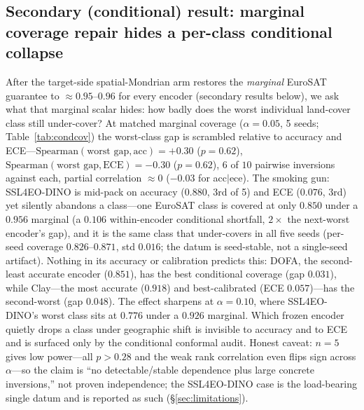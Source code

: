\documentclass[journal]{IEEEtran}
\renewcommand{\_}{\textunderscore\allowbreak}
\begin{document}
\subsection{Secondary (conditional) result: marginal coverage repair hides a per-class conditional collapse}
After the target-side spatial-Mondrian arm restores the \emph{marginal} EuroSAT guarantee to
$\approx0.95$--$0.96$ for every encoder (secondary results below), we ask what that marginal scalar hides:
how badly does the worst individual land-cover class still under-cover? At matched marginal coverage
($\alpha{=}0.05$, 5 seeds; Table~\ref{tab:condcov}) the worst-class gap is scrambled relative to
accuracy and ECE---$\mathrm{Spearman}(\text{worst gap},\text{acc})=+0.30$ ($p{=}0.62$),
$\mathrm{Spearman}(\text{worst gap},\text{ECE})=-0.30$ ($p{=}0.62$), $6$ of $10$ pairwise inversions
against each, partial correlation $\approx0$ ($-0.03$ for acc$\mid$ece). The smoking gun: SSL4EO-DINO is
mid-pack on accuracy ($0.880$, 3rd of 5) and ECE ($0.076$, 3rd) yet silently abandons a class---one
EuroSAT class is covered at only $0.850$ under a $0.956$ marginal (a $0.106$ within-encoder conditional
shortfall, $2\times$ the next-worst encoder's gap), and it is the same class that under-covers in all
five seeds (per-seed coverage $0.826$--$0.871$, std $0.016$; the datum is seed-stable, not a single-seed
artifact). Nothing in its accuracy or calibration predicts this:
DOFA, the second-least accurate encoder ($0.851$), has the best conditional coverage (gap
$0.031$), while Clay---the most accurate ($0.918$) and best-calibrated (ECE $0.057$)---has the
second-worst (gap $0.048$). The effect sharpens at $\alpha{=}0.10$, where SSL4EO-DINO's worst class
sits at $0.776$ under a $0.926$ marginal. Which frozen encoder quietly drops a class under geographic shift
is invisible to accuracy and to ECE and is surfaced only by the conditional conformal audit. Honest
caveat: $n{=}5$ gives low power---all $p>0.28$ and the weak rank correlation even flips sign across
$\alpha$---so the claim is ``no detectable/stable dependence plus large concrete inversions,'' not proven
independence; the SSL4EO-DINO case is the load-bearing single datum and is reported as such
(\S\ref{sec:limitations}).
\end{document}
